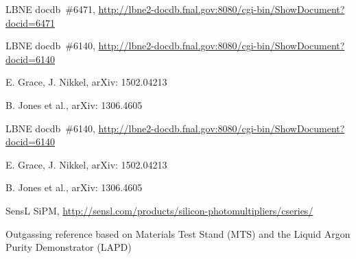 \begin{thebibliography}{99}
 LBNE docdb~\#6471, \url{http://lbne2-docdb.fnal.gov:8080/cgi-bin/ShowDocument?docid=6471}

 LBNE docdb~\#6140, \url{http://lbne2-docdb.fnal.gov:8080/cgi-bin/ShowDocument?docid=6140}




 E. Grace, J. Nikkel,  arXiv: 1502.04213

 B. Jones et al., arXiv: 1306.4605

 LBNE docdb~\#6140, \url{http://lbne2-docdb.fnal.gov:8080/cgi-bin/ShowDocument?docid=6140}

 E. Grace, J. Nikkel,  arXiv: 1502.04213

 B. Jones et al., arXiv: 1306.4605


 SensL SiPM, \url{http://sensl.com/products/silicon-photomultipliers/cseries/}


%
%




 Outgassing reference based on Materials Test Stand (MTS) and the Liquid Argon Purity Demonstrator (LAPD)

%
%


\end{thebibliography}
